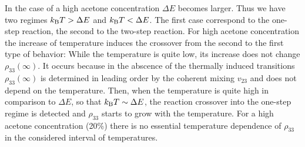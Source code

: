 \documentclass[12pt,twoside,a4paper]{report}
\begin{document}
In the case of a high acetone concentration 
$\Delta E$
becomes larger.
%
Thus we have two regimes
$k
 _{\rm 
     B} 
 T
               > 
                  \Delta 
                   E    $
and 
$k
 _{\rm 
     B} 
 T   
               < 
                  \Delta 
                   E    $.
The first case correspond to the one-step reaction,
the second to the
 two-step reaction.
%
For high acetone concentration the increase of temperature
induces the crossover from the second to the first 
type of behavior:
While the temperature is quite low, 
its increase 
does not change 
$\rho_{33}(\infty)$.
It occurs 
because  
in the abscence of the thermally induced transitions
$\rho_{33}(\infty)$ 
is determined in leading order by the coherent mixing $v_{23}$
and does not depend 
on  the temperature. 
Then, when the temperature is quite high in comparison to $\Delta E$, so that 
$k
 _{\rm B}
 T 
          \sim 
                  \Delta E$,
%
the reaction crossover
into the one-step regime is detected and 
$\rho_{33}$ starts to grow with the temperature. 
For a high acetone concentration (20\%) there is no 
essential
temperature dependence of  
$\rho_{33}$
in the considered interval of temperatures. 
 
 
\end{document}
